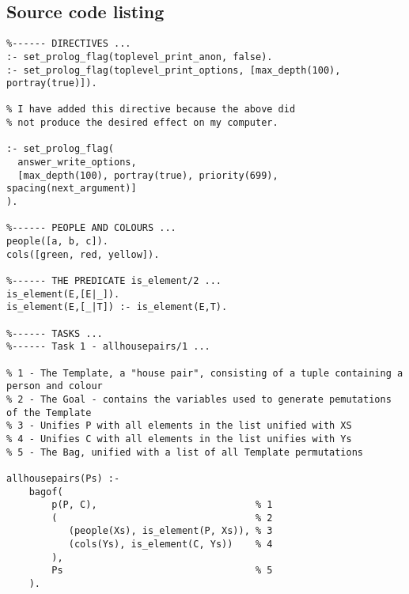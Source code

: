 \documentclass[11pt]{article}
\begin{document}
\subsection{Source code listing}
\begin{verbatim}
%------ DIRECTIVES ...
:- set_prolog_flag(toplevel_print_anon, false).
:- set_prolog_flag(toplevel_print_options, [max_depth(100), portray(true)]).

% I have added this directive because the above did 
% not produce the desired effect on my computer. 

:- set_prolog_flag(
  answer_write_options, 
  [max_depth(100), portray(true), priority(699), spacing(next_argument)]
).

%------ PEOPLE AND COLOURS ...
people([a, b, c]).
cols([green, red, yellow]).

%------ THE PREDICATE is_element/2 ...
is_element(E,[E|_]).
is_element(E,[_|T]) :- is_element(E,T).

%------ TASKS ...
%------ Task 1 - allhousepairs/1 ...

% 1 - The Template, a "house pair", consisting of a tuple containing a person and colour
% 2 - The Goal - contains the variables used to generate pemutations of the Template
% 3 - Unifies P with all elements in the list unified with XS
% 4 - Unifies C with all elements in the list unifies with Ys
% 5 - The Bag, unified with a list of all Template permutations

allhousepairs(Ps) :- 
    bagof(
        p(P, C),                            % 1
        (                                   % 2
           (people(Xs), is_element(P, Xs)), % 3
           (cols(Ys), is_element(C, Ys))    % 4
        ), 
        Ps                                  % 5
    ).
\end{verbatim}
\end{document}
